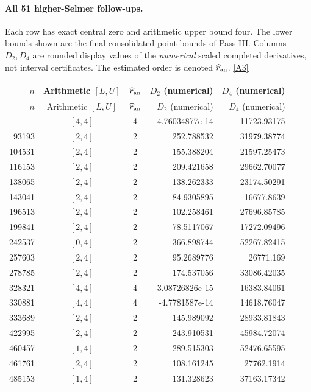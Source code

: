 \documentclass[11pt]{article}
\newcommand{\srcref}[1]{\hyperlink{source:#1}{[#1]}}
\begin{document}
\paragraph{All 51 higher-Selmer follow-ups.}
Each row has exact central zero and arithmetic upper bound four. The lower
bounds shown are the final consolidated point bounds of Pass III. Columns
$D_2,D_4$ are rounded display values of the \emph{numerical} scaled completed
derivatives, not interval certificates. The estimated order is denoted
$\widehat r_{\rm an}$. \srcref{A3}
\begingroup\small
\setlength{\tabcolsep}{5pt}
\begin{longtable}{r c c r r}
\toprule
$n$ & Arithmetic $[L,U]$ & $\widehat r_{\rm an}$ & $D_2$ (numerical) & $D_4$ (numerical)\\
\midrule\endfirsthead
\toprule
$n$ & Arithmetic $[L,U]$ & $\widehat r_{\rm an}$ & $D_2$ (numerical) & $D_4$ (numerical)\\
\midrule\endhead
\bottomrule\endfoot
57715 & $[4,4]$ & 4 & 4.76034877e-14 & 11723.93175\\
93193 & $[2,4]$ & 2 & 252.788532 & 31979.38774\\
104531 & $[2,4]$ & 2 & 155.388204 & 21597.25473\\
116153 & $[2,4]$ & 2 & 209.421658 & 29662.70077\\
138065 & $[2,4]$ & 2 & 138.262333 & 23174.50291\\
143041 & $[2,4]$ & 2 & 84.9305895 & 16677.8639\\
196513 & $[2,4]$ & 2 & 102.258461 & 27696.85785\\
199841 & $[2,4]$ & 2 & 78.5117067 & 17272.09496\\
242537 & $[0,4]$ & 2 & 366.898744 & 52267.82415\\
257603 & $[2,4]$ & 2 & 95.2689776 & 26771.169\\
278785 & $[2,4]$ & 2 & 174.537056 & 33086.42035\\
328321 & $[4,4]$ & 4 & 3.08726826e-15 & 16383.84061\\
330881 & $[4,4]$ & 4 & -4.7781587e-14 & 14618.76047\\
333689 & $[2,4]$ & 2 & 145.989092 & 28933.81843\\
422995 & $[2,4]$ & 2 & 243.910531 & 45984.72074\\
460457 & $[1,4]$ & 2 & 289.515303 & 52476.65595\\
461761 & $[2,4]$ & 2 & 108.161245 & 27762.1914\\
485153 & $[1,4]$ & 2 & 131.328623 & 37163.17342\\

\end{longtable}
\end{document}
